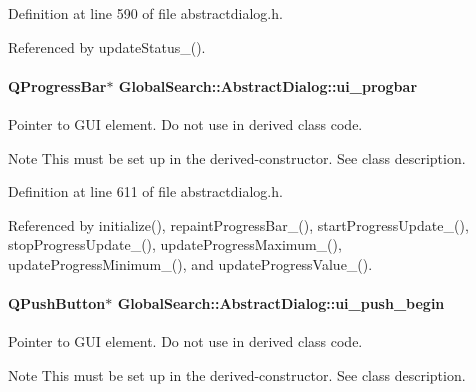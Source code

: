 Definition at line 590 of file abstractdialog.\+h.



Referenced by update\+Status\+\_\+().

\hypertarget{classGlobalSearch_1_1AbstractDialog_a9b91400d03e9c7f3e94bf6b1f91bb97a}{}
\paragraph[{ui\+\_\+progbar}]{\setlength{\rightskip}{0pt plus 5cm}Q\+Progress\+Bar$\ast$ Global\+Search\+::\+Abstract\+Dialog\+::ui\+\_\+progbar\hspace{0.3cm}{\ttfamily [protected]}}\label{classGlobalSearch_1_1AbstractDialog_a9b91400d03e9c7f3e94bf6b1f91bb97a}
Pointer to G\+U\+I element. Do not use in derived class code. \begin{DoxyNote}{Note}
This must be set up in the derived-\/constructor. See class description. 
\end{DoxyNote}


Definition at line 611 of file abstractdialog.\+h.



Referenced by initialize(), repaint\+Progress\+Bar\+\_\+(), start\+Progress\+Update\+\_\+(), stop\+Progress\+Update\+\_\+(), update\+Progress\+Maximum\+\_\+(), update\+Progress\+Minimum\+\_\+(), and update\+Progress\+Value\+\_\+().

\hypertarget{classGlobalSearch_1_1AbstractDialog_a526c9ad4ea52454ba41be74de24cdd6c}{}
\paragraph[{ui\+\_\+push\+\_\+begin}]{\setlength{\rightskip}{0pt plus 5cm}Q\+Push\+Button$\ast$ Global\+Search\+::\+Abstract\+Dialog\+::ui\+\_\+push\+\_\+begin\hspace{0.3cm}{\ttfamily [protected]}}\label{classGlobalSearch_1_1AbstractDialog_a526c9ad4ea52454ba41be74de24cdd6c}
Pointer to G\+U\+I element. Do not use in derived class code. \begin{DoxyNote}{Note}
This must be set up in the derived-\/constructor. See class description. 
\end{DoxyNote}


